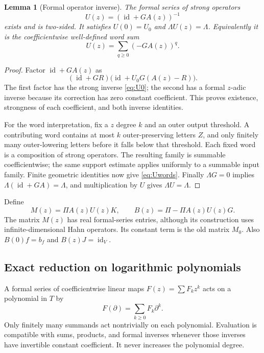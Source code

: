 \documentclass[11pt,a4paper]{article}
\numberwithin{equation}{section}
\newtheorem{lemma}[theorem]{Lemma}
\theoremstyle{definition}
\theoremstyle{remark}
\theoremstyle{definition}
\newcommand{\Id}{\operatorname{id}}
\begin{document}
\begin{lemma}[Formal operator inverse]
\label{lem:Uz}
The formal series of strong operators
\begin{equation}
 U(z)=(\Id+GA(z))^{-1}
 \label{eq:Uz}
\end{equation}
exists and is two-sided. It satisfies $U(0)=U_0$ and $\Lambda U(z)=\Lambda$. Equivalently it is the coefficientwise well-defined word sum
\begin{equation}
 U(z)=\sum_{q\ge0}(-GA(z))^q.
 \label{eq:Uwords}
\end{equation}
\end{lemma}
\begin{proof}
Factor $\Id+GA(z)$ as
\[
 (\Id+GR)\bigl(\Id+U_0G(A(z)-R)\bigr).
\]
The first factor has the strong inverse \eqref{eq:U0}; the second has a formal $z$-adic inverse because its correction has zero constant coefficient. This proves existence, strongness of each coefficient, and both inverse identities.

For the word interpretation, fix a $z$ degree $k$ and an outer output threshold. A contributing word contains at most $k$ outer-preserving letters $Z$, and only finitely many outer-lowering letters before it falls below that threshold. Each fixed word is a composition of strong operators. The resulting family is summable coefficientwise; the same support estimate applies uniformly to a summable input family. Finite geometric identities now give \eqref{eq:Uwords}. Finally $\Lambda G=0$ implies $\Lambda(\Id+GA)=\Lambda$, and multiplication by $U$ gives $\Lambda U=\Lambda$.
\end{proof}

Define
\begin{equation}
 M(z)=\Pi A(z)U(z)K,
 \qquad B(z)=\Pi-\Pi A(z)U(z)G.
 \label{eq:MBz}
\end{equation}
The matrix $M(z)$ has real formal-series entries, although its construction uses infinite-dimensional Hahn operators. Its constant term is the old matrix $M_0$. Also $B(0)f=b_f$ and $B(z)J=\Id_V$.

\subsection{Exact reduction on logarithmic polynomials}
A formal series of coefficientwise linear maps $F(z)=\sum F_kz^k$ acts on a polynomial in $T$ by
\[
 F(\partial)=\sum_{k\ge0}F_k\partial^k.
\]
Only finitely many summands act nontrivially on each polynomial. Evaluation is compatible with sums, products, and formal inverses whenever those inverses have invertible constant coefficient. It never increases the polynomial degree.
\end{document}
